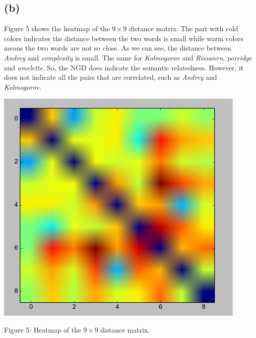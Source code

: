 \documentclass{article}
\begin{document}
\subsection*{(b)}

Figure 5 shows the heatmap of the $9 \times 9$ distance matrix. The part with cold colors indicates the distance between the two words is small while warm colors means the two words are not so close. As we can see, the distance between \emph{Andrey} and \emph{complexity} is small. The same for \emph{Kolmogorov} and \emph{Rissanen}, \emph{porridge} and \emph{omelette}. So, the NGD does indicate the semantic relatedness. However, it does not indicate all the pairs that are correlated, such as \emph{Andrey} and \emph{Kolmogorov}.

\vspace{5mm}
\begin{minipage}{0.9\textwidth}
  \includegraphics[width=\textwidth,keepaspectratio]{5.png}
  \centerline{Figure 5: Heatmap of the $9 \times 9$ distance matrix.}
\end{minipage}
\vspace{5mm}
\end{document}
